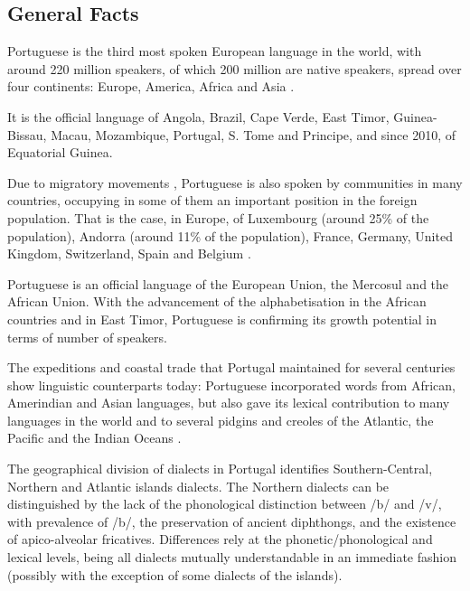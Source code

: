 \begin{multicols}{2}

\subsection{General Facts}

Portuguese is the third most spoken European language in the world, with around 220 million speakers, of which  200 million are native speakers, spread over four continents: Europe, America, Africa and Asia \cite{observatorio} \cite{ethnologue}. 

   It is the official language of Angola, Brazil, Cape Verde, East Timor, Guinea-Bissau, Macau, Mozambique, Portugal, S. Tome and Principe, and since 2010, of Equatorial Guinea. 


   Due to migratory movements \cite{stat1} \cite{obsemig}, Portuguese is also spoken by communities in many countries, occupying in some of them an important position in the foreign population. That is the case, in Europe, of Luxembourg (around 25\% of the population), Andorra (around 11\% of the population), France, Germany, United Kingdom, Switzerland, Spain and Belgium \cite{linha}.

 Portuguese is an official language of the European Union, the Mercosul and the African Union. With the advancement of the alphabetisation 
in the African countries and in East Timor, Portuguese is confirming its growth potential in terms of number of speakers.

The expeditions and coastal trade that Portugal maintained for several centuries show linguistic counterparts today: Portuguese incorporated words from African, Amerindian and Asian languages, but also gave its lexical contribution to many languages in the world and to several pidgins and creoles of the Atlantic, the Pacific and the Indian Oceans \cite{andrade}  \cite{camoes}.

   The geographical division of dialects in Portugal \cite{cintra} identifies Southern-Central, Northern and Atlantic islands dialects. The Northern dialects can be distinguished by the lack of the phonological distinction between /b/ and /v/, with prevalence of /b/, the preservation of ancient diphthongs, and the existence of apico-alveolar fricatives. Differences rely at the phonetic/phonological and lexical levels, being all dialects mutually understandable in an immediate fashion (possibly with the exception of some dialects of the islands).


\end{multicols}
